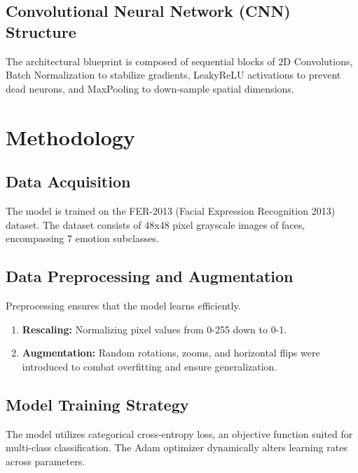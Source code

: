 \documentclass[12pt,a4paper]{report}
\begin{document}
\lipsum[66-70] %

\section{Convolutional Neural Network (CNN) Structure}
The architectural blueprint is composed of sequential blocks of 2D Convolutions, Batch Normalization to stabilize gradients, LeakyReLU activations to prevent dead neurons, and MaxPooling to down-sample spatial dimensions.

\lipsum[71-80] %


\chapter{Methodology}

\section{Data Acquisition}
The model is trained on the FER-2013 (Facial Expression Recognition 2013) dataset. The dataset consists of 48x48 pixel grayscale images of faces, encompassing 7 emotion subclasses.

\lipsum[81-85] %

\section{Data Preprocessing and Augmentation}
Preprocessing ensures that the model learns efficiently. 
\begin{enumerate}
    \item \textbf{Rescaling:} Normalizing pixel values from 0-255 down to 0-1.
    \item \textbf{Augmentation:} Random rotations, zooms, and horizontal flips were introduced to combat overfitting and ensure generalization.
\end{enumerate}

\lipsum[86-90] %

\section{Model Training Strategy}
The model utilizes categorical cross-entropy loss, an objective function suited for multi-class classification. The Adam optimizer dynamically alters learning rates across parameters.
\lipsum[91-100] %
\end{document}
